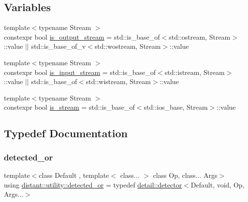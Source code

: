 \subsection*{Variables}
\begin{DoxyCompactItemize}
\item 
{\footnotesize template$<$typename Stream $>$ }\\constexpr bool \mbox{\hyperlink{namespacedistant_1_1utility_a4abab579fa60aa717d9cb9249c4d4da6}{is\+\_\+output\+\_\+stream}} = std\+::is\+\_\+base\+\_\+of$<$std\+::ostream, Stream$>$\+::value $\vert$$\vert$ std\+::is\+\_\+base\+\_\+of\+\_\+v$<$std\+::wostream, Stream$>$\+::value
\item 
{\footnotesize template$<$typename Stream $>$ }\\constexpr bool \mbox{\hyperlink{namespacedistant_1_1utility_a69c3d26cb83bc95d8c18c4d0a26f5ab2}{is\+\_\+input\+\_\+stream}} = std\+::is\+\_\+base\+\_\+of$<$std\+::istream, Stream$>$\+::value $\vert$$\vert$ std\+::is\+\_\+base\+\_\+of$<$std\+::wistream, Stream$>$\+::value
\item 
{\footnotesize template$<$typename Stream $>$ }\\constexpr bool \mbox{\hyperlink{namespacedistant_1_1utility_ab7c9156805fa0568d78be4cb580ae173}{is\+\_\+stream}} = std\+::is\+\_\+base\+\_\+of$<$std\+::ios\+\_\+base, Stream$>$\+::value
\end{DoxyCompactItemize}


\subsection{Typedef Documentation}
\mbox{\label{namespacedistant_1_1utility_a8f1f936c7b4ff942d6fd06522f95008a}} 
\subsubsection{\texorpdfstring{detected\+\_\+or}{detected\_or}}
{\footnotesize\ttfamily template$<$class Default , template$<$ class... $>$ class Op, class... Args$>$ \\
using \mbox{\hyperlink{namespacedistant_1_1utility_a8f1f936c7b4ff942d6fd06522f95008a}{distant\+::utility\+::detected\+\_\+or}} = typedef \mbox{\hyperlink{structdistant_1_1utility_1_1detail_1_1detector}{detail\+::detector}}$<$Default, void, Op, Args...$>$}

